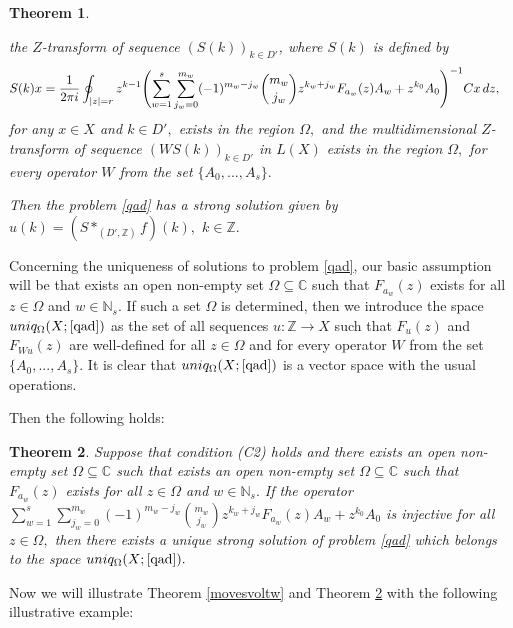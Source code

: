 \documentclass{amsart}
\newtheorem{thm}{Theorem}[section]
\theoremstyle{definition}
\theoremstyle{remark}
\numberwithin{equation}{section}
\begin{document}
\begin{thm}
\begin{itemize}
the $Z$-transform of sequence $(S(k))_{k\in D'}$, where $S(k)$ is defined by 
{\small
\begin{align*}\notag &
S(k)x=\frac{1}{ 2\pi i }\oint_{|z |=r } z ^{k -1} 
\Biggl(\sum_{w=1}^{s}\sum_{j_{w}=0}^{m_{w}}(-1)^{m_{w}-j_{w}}\binom{m_{w}}{j_{w}}z^{k_{w}+j_{w}}F_{a_{w}}(z)A_{w}+z^{k_{0}}A_{0}\Biggr) ^{-1}Cx\, dz,
\end{align*}}for any $x\in X$ and $k\in D',$
exists in the region $\Omega ,$ and the multidimensional $Z$-transform of sequence $(WS(k))_{k\in D'}$ in $L(X)$ exists in the region $\Omega ,$ for every operator $W$ from the set $\{A_{0},...,A_{s}\}.$
\end{itemize} 
Then the problem \eqref{qad} has a strong solution given by $u(k)= (S\ast_{(D',{\mathbb Z})} f)(k),$ $k\in {\mathbb Z}.$ 
\end{thm}

Concerning the uniqueness of solutions to problem \eqref{qad}, our basic assumption will be that exists an open non-empty set $\Omega \subseteq {\mathbb C}$ such that $F_{a_{w}}(z)$ exists for all $z\in \Omega$ and $w \in {\mathbb N}_{s}.$ If such a set $\Omega$ is  determined, then we introduce the space
$
uniq_{\Omega}(X;\eqref{qad})$ as the set of all sequences $u : {\mathbb Z} \rightarrow X$ such that $F_{u}(z) $ and $F_{Wu}(z)$ are well-defined for all $z\in \Omega$ and for every operator $W$ from the set $\{ A_{ 0},...,A_{ s } \}.$
It is clear that $uniq_{\Omega}(X;\eqref{qad})$ is a vector space with the usual operations. 

Then the following holds:

\begin{thm}\label{iniqvoltw}
Suppose that condition \emph{(C2)} holds and there exists an open non-empty set  $\Omega \subseteq {\mathbb C}$ such that exists an open non-empty set $\Omega \subseteq {\mathbb C}$ such that $F_{a_{w}}(z)$ exists for all $z\in \Omega$ and $w \in {\mathbb N}_{s}.$ If the operator\\ $\sum_{w=1}^{s}\sum_{j_{w}=0}^{m_{w}}(-1)^{m_{w}-j_{w}}\binom{m_{w}}{j_{w}}z^{k_{w}+j_{w}}F_{a_{w}}(z)A_{w}+z^{k_{0}}A_{0}$ is injective for all $z\in \Omega ,$ then there exists a unique strong solution of problem \eqref{qad} which belongs to the space $uniq_{\Omega}(X;\eqref{qad}).$  
\end{thm}

Now we will illustrate Theorem \ref{movesvoltw} and Theorem \ref{iniqvoltw} with the following illustrative example:
\end{document}
